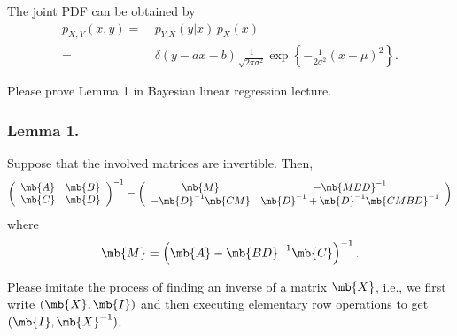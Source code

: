\begin{exercise}
\begin{enumerate}
\begin{solution}
                The joint PDF can be obtained by
                \begin{align*}
                    p_{X,Y}(x,y)=\  & p_{Y|X}(y|x)\,p_X(x)                                                                          \\
                    =\              & \delta(y-ax-b)\frac{1}{\sqrt{2\pi\sigma^2}}\exp\left\{-\frac{1}{2\sigma^2}(x-\mu)^2\right\}.
                \end{align*}
                \qedhere
            \end{solution}
    \end{enumerate}
    
\end{exercise}
\newpage




\begin{exercise}
    Please prove Lemma 1 in Bayesian linear regression lecture.
    \subsubsection*{Lemma 1.}
    Suppose that the involved matrices are invertible. Then,
    \begin{align*}
        \left(\begin{array}{ll}
                  \mb{A} & \mb{B} \\
                  \mb{C} & \mb{D}
              \end{array}\right)^{-1}=
        \left(\begin{array}{cc}
                      \mb{M}                & -\mb{M B D}^{-1}                          \\
                      -\mb{D}^{-1} \mb{C M} & \mb{D}^{-1}+\mb{D}^{-1} \mb{C M B D}^{-1}
                  \end{array}\right)
    \end{align*}
    where
    \begin{align*}
        \mb{M}=\left(\mb{A}-\mb{B D}^{-1} \mb{C}\right)^{-1}.
    \end{align*}
    
    Please imitate the process of finding an inverse of a matrix $\mb{X}$, i.e., we first write $(\mb{X},\mb{I})$ and then executing elementary row operations to get $(\mb{I}, \mb{X}^{-1})$.
    

\end{exercise}
